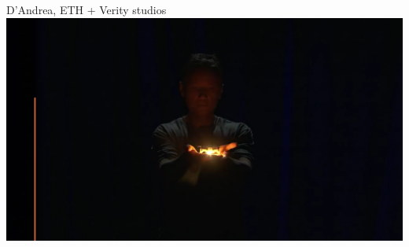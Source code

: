 \documentclass[aspectratio=169]{beamer}
\begin{document}
\begin{frame}{D'Andrea, ETH + Verity studios}
        	\centering
            \href{run:./videos/DAndre_TED_talk.mp4?autostart}
            {\includegraphics[width=.95\linewidth]{images/DAndre_TED_talk.png}}
\end{frame}
\end{document}
